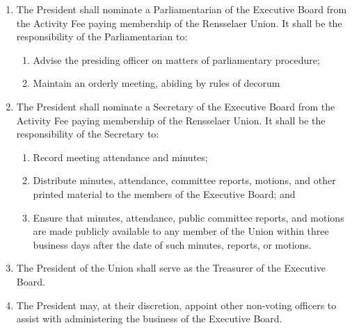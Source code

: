 \begin{enumerate}
\begin{enumerate}
\begin{enumerate}
    \item Should a decision power not be explicitly listed in the regulation, it shall not be overridable.
    \end{enumerate}
  \item For overrideable decisions made outside of a regular Board meeting, the President must inform the Vice Presidents of their intended decision, and the Vice Presidents have 16 hours to overrule their decision.
    \begin{enumerate}
    \item Should no decision be made within those 16 hours, the President may inform the relevant party of their decision.
    \item The Vice Presidents may waive their ability to overrule, in which case the President may inform the relevant parties.
    \end{enumerate}
  \end{enumerate}
\item The President shall nominate a Parliamentarian of the Executive Board from the Activity Fee paying membership of the Rensselaer Union. It shall be the responsibility of the Parliamentarian to:
  \begin{enumerate}
  \item Advise the presiding officer on matters of parliamentary procedure;
  \item Maintain an orderly meeting, abiding by rules of decorum
  \end{enumerate}
\item The President shall nominate a Secretary of the Executive Board from the Activity Fee paying membership of the Rensselaer Union. It shall be the responsibility of the Secretary to:
  \begin{enumerate}
  \item Record meeting attendance and minutes;
  \item Distribute minutes, attendance, committee reports, motions, and other printed material to the members of the Executive Board; and
  \item Ensure that minutes, attendance, public committee reports, and motions are made publicly available to any member of the Union within three business days after the date of such minutes, reports, or motions.
  \end{enumerate}
\item The President of the Union shall serve as the Treasurer of the Executive Board.
\item The President may, at their discretion, appoint other non-voting officers to assist with administering the business of the Executive Board.

\end{enumerate}
